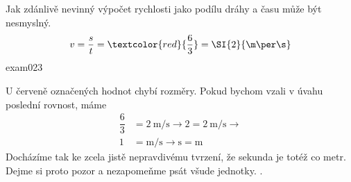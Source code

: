 \begin{fyzexam}{Jak zdánlivě nevinný výpočet rychlosti jako podílu dráhy a času může být nesmyslný.  
  \[v = \dfrac{s}{t} = \textcolor{red}{\dfrac{6}{3}} =
  \SI{2}{\m\per\s}\]}{exam023}    

  U červeně označených hodnot chybí rozměry. Pokud bychom vzali v úvahu poslední rovnost, máme
  \begin{align*}
    \dfrac{6}{3} &= \SI{2}{\m\per\s}  \rightarrow 2 = \SI{2}{\m\per\s}  \rightarrow \\
               1 &= \si{\m\per\s}     \rightarrow     \si{\s} = \si{\m} 
  \end{align*}
  Docházíme tak ke zcela jistě nepravdivému tvrzení, že sekunda je totéž co metr. Dejme si proto
  pozor a nezapomeňme psát všude jednotky. \cite[s.~1]{Kulhanek2020}. 
\end{fyzexam}